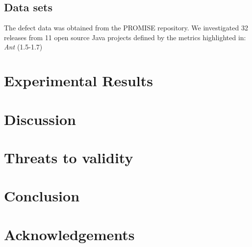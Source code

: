\documentclass[conference]{IEEEtran}
\begin{document}
\subsection{Data sets}
The defect data was obtained from the PROMISE repository. We investigated 32 releases from 11 open source Java projects defined by the metrics highlighted in: \textit{Ant} (1.5-1.7) 
\section{Experimental Results}
\section{Discussion}
\section{Threats to validity}
\section{Conclusion}
\section*{Acknowledgements}
\end{document}

